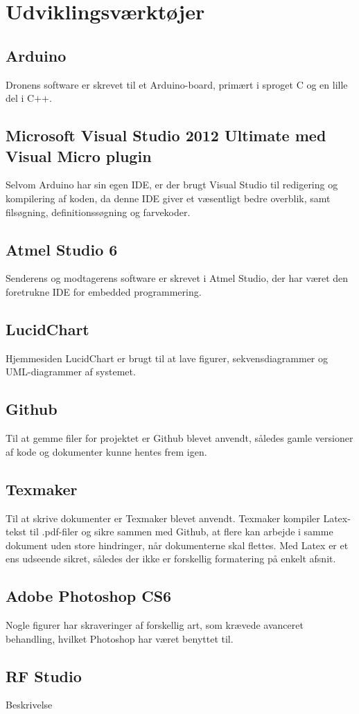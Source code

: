 \documentclass[Main]{subfiles}
\begin{document}
\section{Udviklingsværktøjer}

\subsection{Arduino}
Dronens software er skrevet til et Arduino-board, primært i sproget C og en lille del i C++.

\subsection{Microsoft Visual Studio 2012 Ultimate med Visual Micro plugin}
Selvom Arduino har sin egen IDE, er der brugt Visual Studio til redigering og kompilering af koden, da denne IDE giver et væsentligt bedre overblik, samt filsøgning, definitionssøgning og farvekoder.

\subsection{Atmel Studio 6}
Senderens og modtagerens software er skrevet i Atmel Studio, der har været den foretrukne IDE for embedded programmering.

\subsection{LucidChart}
Hjemmesiden LucidChart er brugt til at lave figurer, sekvensdiagrammer og UML-diagrammer af systemet.

\subsection{Github}
Til at gemme filer for projektet er Github blevet anvendt, således gamle versioner af kode og dokumenter kunne hentes frem igen.

\subsection{Texmaker}
Til at skrive dokumenter er Texmaker blevet anvendt.
Texmaker kompiler Latex-tekst til .pdf-filer og sikre sammen med Github, at flere kan arbejde i samme dokument uden store hindringer, når dokumenterne skal flettes.
Med Latex er et ens udseende sikret, således der ikke er forskellig formatering på enkelt afsnit.

\subsection{Adobe Photoshop CS6}
Nogle figurer har skraveringer af forskellig art, som krævede avanceret behandling, hvilket Photoshop har været benyttet til.

\subsection{RF Studio}
Beskrivelse
\end{document}
